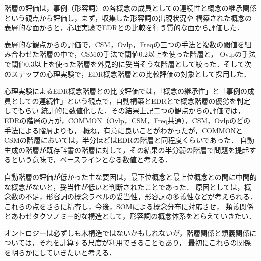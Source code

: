 \documentclass[japanese]{jnlp_1.4}
\begin{document}
階層の評価は，事例（形容詞）の各概念の成員としての連続性と概念の継承関係という観点から評価し，まず，収集した形容詞の出現状況や
構築された概念の表層的な面からと，心理実験でEDRとの比較を行う質的な面から評価した．

表層的な観点からの評価で，CSM，Ovlp，Freqの三つの手法と複数の閾値を組み合わせた階層の中で，CSMの手法で閾値0.2以上を使った階層と，
Ovlpの手法で閾値0.3以上を使った階層を外見的に妥当そうな階層として絞った．そして次のステップの心理実験で，EDR概念階層との比較評価の対象として採用した．

心理実験によるEDR概念階層との比較評価では，「概念の継承性」と「事例の成員としての連続性」という観点で，自動構築とEDRとで概念階層の優劣を判定してもらい
統計的に数値化した．その結果上記二つの観点からの評価では，EDRの階層の方が，COMMON（Ovlp，CSM，Freq共通），CSM，Ovlpのどの手法による階層よりも，
概ね，有意に良いことがわかったが，COMMONとCSMの階層においては，半分ほどはEDRの階層と同程度くらいであった．
自動生成の階層が既存辞書の階層に対して，その結果の半分弱の階層で問題を提起するという意味で，ベースラインとなる数値と考える．

自動階層の評価が低かった主な要因は，最下位概念と最上位概念との間に中間的な概念がないと，妥当性が低いと判断されたことであった．
原因としては，概念数の不足，形容詞の概念ラベルの妥当性，形容詞の多義性などが考えられる．これらの点をさらに精査し，今後，SOMによる概念分布に対応させ，
類義関係とあわせタクソノミー的な構造として，形容詞の概念体系をとらえていきたい．

オントロジーは必ずしも木構造ではないかもしれないが，階層関係と類義関係については，それを計算する尺度が利用できることもあり，
最初にこれらの関係を明らかにしていきたいと考える．
\end{document}
